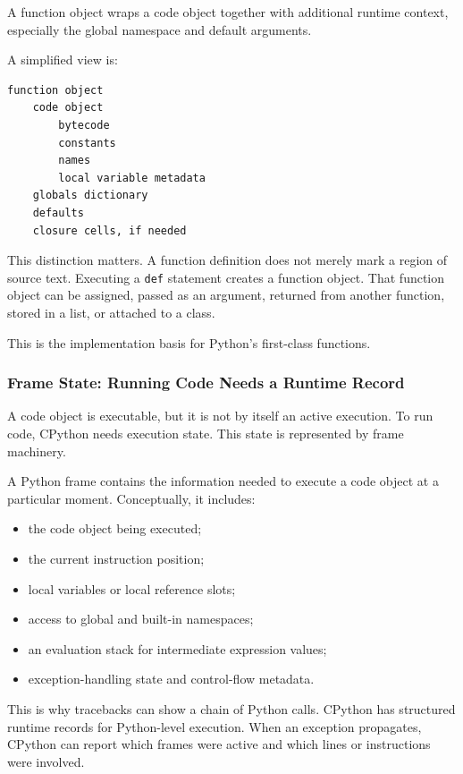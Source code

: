 A function object wraps a code object together with additional runtime context, especially the global namespace and default arguments.

A simplified view is:

\begin{verbatim}
function object
    code object
        bytecode
        constants
        names
        local variable metadata
    globals dictionary
    defaults
    closure cells, if needed
\end{verbatim}

This distinction matters. A function definition does not merely mark a region of source text. Executing a \texttt{def} statement creates a function object. That function object can be assigned, passed as an argument, returned from another function, stored in a list, or attached to a class.

This is the implementation basis for Python's first-class functions.

\subsubsection{Frame State: Running Code Needs a Runtime Record}

A code object is executable, but it is not by itself an active execution. To run code, CPython needs execution state. This state is represented by frame machinery.

A Python frame contains the information needed to execute a code object at a particular moment. Conceptually, it includes:

\begin{itemize}
    \item the code object being executed;
    \item the current instruction position;
    \item local variables or local reference slots;
    \item access to global and built-in namespaces;
    \item an evaluation stack for intermediate expression values;
    \item exception-handling state and control-flow metadata.
\end{itemize}

This is why tracebacks can show a chain of Python calls. CPython has structured runtime records for Python-level execution. When an exception propagates, CPython can report which frames were active and which lines or instructions were involved.

